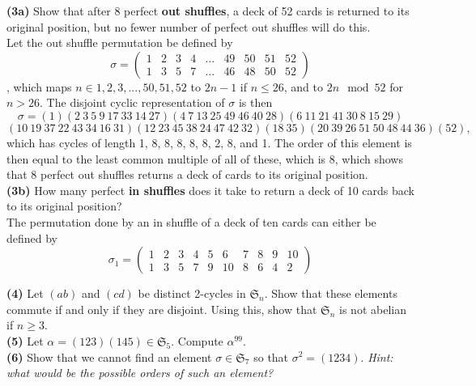 \documentclass[12pt,letterpaper]{article}
\begin{document}
\textbf{(3a)} Show that after 8 perfect \textbf{out shuffles}, a deck of 52 cards is returned to its original position, but no fewer number of perfect out shuffles will do this.\\

Let the out shuffle permutation be defined by \[\sigma  = \begin{pmatrix} 1 & 2 & 3 & 4 & ... & 49 & 50 & 51 & 52\\ 1 & 3 & 5 & 7 & ... & 46 & 48 & 50 & 52 \end{pmatrix}\], which maps \(n \in 1,2,3,...,50,51,52\) to \(2n-1\) if \(n \leq 26\), and to \(2n \mod 52\) for \(n > 26\). The disjoint cyclic representation of \(\sigma\) is then \[\sigma = (1)(2\ 3\ 5\ 9\ 17\ 33\ 14\ 27)(4\ 7\ 13\ 25\ 49\ 46\ 40\ 28)(6\ 11\ 21\ 41\ 30\ 8\ 15\ 29)\]\[(10\ 19\ 37\ 22\ 43\ 34\ 16\ 31)(12\ 23\ 45\ 38\ 24\ 47\ 42\ 32)(18\ 35)(20\ 39\ 26\ 51\ 50\ 48\ 44\ 36)(52),\] which has cycles of length 1, 8, 8, 8, 8, 8, 2, 8, and 1. The order of this element is then equal to the least common multiple of all of these, which is \(8\), which shows that \(8\) perfect out shuffles returns a deck of cards to its original position. \\

\textbf{(3b)} How many perfect \textbf{in shuffles} does it take to return a deck of 10 cards back to its original position?\\

The permutation done by an in shuffle of a deck of ten cards can either be defined by \[\sigma_{1} = \begin{pmatrix} 1 & 2 & 3 & 4 & 5 & 6 & 7 & 8 & 9 & 10 \\ 1 & 3 & 5 & 7 & 9 & 10 & 8 & 6 & 4 & 2 \end{pmatrix}\]

\textbf{(4)} Let \((ab)\) and \((cd)\) be distinct 2-cycles in \(\mathfrak{S}_{n}\). Show that these elements commute if and only if they are disjoint. Using this, show that \(\mathfrak{S}_{n}\) is not abelian if \(n \geq 3\).\\



\textbf{(5)} Let \(\alpha = (123)(145) \in \mathfrak{S}_{5}.\) Compute \(\alpha^{99}\).\\



\textbf{(6)} Show that we cannot find an element \(\sigma \in \mathfrak{S}_{7}\) so that \(\sigma^{2} = (1234).\) \textit{Hint: what would be the possible orders of such an element?}\\
\end{document}
